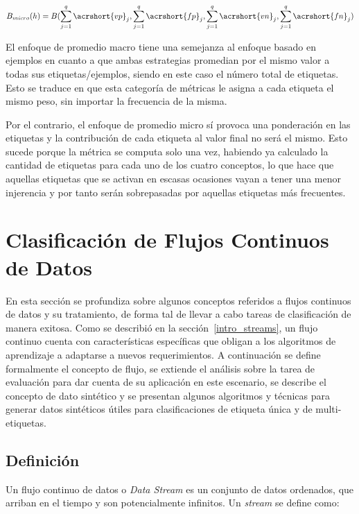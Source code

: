 \begin{equation}
	B_{micro}(h) = B( \sum_{j=1}^{q} \acrshort{vp}_{j}, \sum_{j=1}^{q}
	\acrshort{fp}_{j},\sum_{j=1}^{q}  \acrshort{vn}_{j},\sum_{j=1}^{q}
	\acrshort{fn}_{j})
\end{equation}

El enfoque de promedio macro tiene una semejanza al enfoque basado en ejemplos
en cuanto a que ambas estrategias promedian por el mismo valor a todas sus
etiquetas/ejemplos, siendo en este caso el número total de etiquetas. Esto se
traduce en que esta categoría de métricas le asigna a cada etiqueta el mismo
peso, sin importar la frecuencia de la misma.

Por el contrario, el enfoque de promedio micro sí provoca una ponderación en las
etiquetas y la contribución de cada etiqueta al valor final no será el mismo.
Esto sucede porque la métrica se computa solo una vez, habiendo ya calculado la
cantidad de etiquetas para cada uno de los cuatro conceptos, lo que hace que
aquellas etiquetas que se activan en escasas ocasiones vayan a tener una menor
injerencia y por tanto serán sobrepasadas por aquellas etiquetas más frecuentes.

\section{Clasificación de Flujos Continuos de Datos}

En esta sección se profundiza sobre algunos conceptos referidos a flujos
continuos de datos y su tratamiento, de forma tal de llevar a cabo tareas de
clasificación de manera exitosa.  Como se describió en la
sección~\ref{intro_streams}, un flujo continuo cuenta con características
específicas que obligan a los algoritmos de aprendizaje a adaptarse a nuevos
requerimientos.  A continuación se define formalmente el concepto de flujo, se
extiende el análisis sobre la tarea de evaluación para dar cuenta de su
aplicación en este escenario, se describe el concepto de dato sintético y se
presentan algunos algoritmos y técnicas para generar datos sintéticos útiles
para clasificaciones de etiqueta única y de multi-etiquetas.

\subsection{Definición}

Un flujo continuo de datos o \textit{Data Stream} es un conjunto de datos
ordenados, que arriban en el tiempo y son potencialmente infinitos. Un
\textit{stream} se define como:


